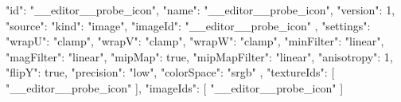 {
  "id": "__editor__probe_icon",
  "name": "__editor__probe_icon",
  "version": 1,
  "source": {
    "kind": "image",
    "imageId": "__editor__probe_icon"
  },
  "settings": {
    "wrapU": "clamp",
    "wrapV": "clamp",
    "wrapW": "clamp",
    "minFilter": "linear",
    "magFilter": "linear",
    "mipMap": true,
    "mipMapFilter": "linear",
    "anisotropy": 1,
    "flipY": true,
    "precision": "low",
    "colorSpace": "srgb"
  },
  "textureIds": [
    "__editor__probe_icon"
  ],
  "imageIds": [
    "__editor__probe_icon"
  ]
}
